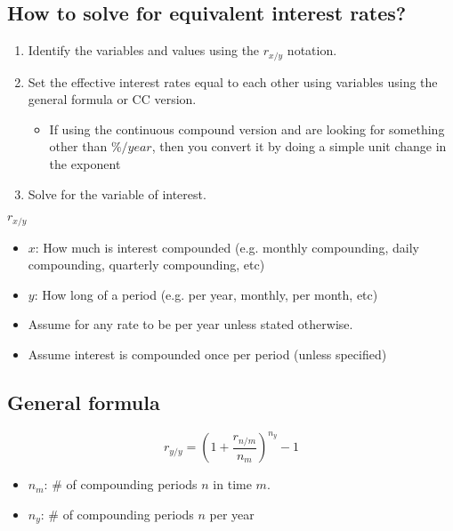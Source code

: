 \subsection{How to solve for equivalent interest rates?}
\begin{process}
    \begin{enumerate}
        \item Identify the variables and values using the $r_{x/y}$ notation. 
        \item Set the effective interest rates equal to each other using variables using the general formula or CC version.
        \begin{itemize}
            \item If using the continuous compound version and are looking for something other than $\%/year$, then you convert it by doing a simple unit change in the exponent
        \end{itemize}
        \item Solve for the variable of interest. 
    \end{enumerate}
\end{process}

\begin{intuition}
    $r_{x/y}$
    \begin{itemize}
        \item $x$: How much is interest compounded (e.g. monthly compounding, daily compounding, quarterly compounding, etc)
        \item $y$: How long of a period (e.g. per year, monthly, per month, etc)
    \end{itemize}
\end{intuition}

\begin{warning}
    \begin{itemize}
        \item Assume for any rate to be per year unless stated otherwise. 
        \item Assume interest is compounded once per period (unless specified)
    \end{itemize}
\end{warning}

\subsection{General formula}
\begin{definition}
    \begin{equation}
        r_{y/y} = \left(1 + \frac{r_{n/m}}{n_m}\right)^{n_y} - 1 
    \end{equation}
    \begin{itemize}
        \item $n_m$: \# of compounding periods $n$ in time $m$.
        \item $n_y$: \# of compounding periods $n$ per year
    \end{itemize}
\end{definition}

